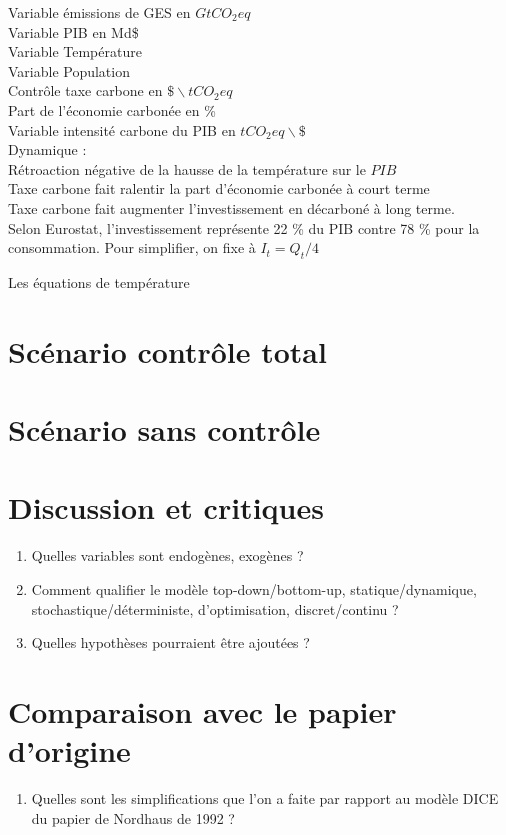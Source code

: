 \documentclass[12pt]{article}
\newcommand{\tco}{tCO_2eq}
\theoremstyle{remark}
\begin{document}
Variable émissions de GES en $G\tco$\\
Variable PIB en Md\$\\
Variable Température \\
Variable Population \\
Contrôle taxe carbone en $\$ \backslash \tco$ \\
Part de l'économie carbonée en \% \\
Variable intensité carbone du PIB en $\tco \backslash \$ $
\\
Dynamique : \\
Rétroaction négative de la hausse de la température sur le $PIB$ \\
Taxe carbone fait ralentir la part d'économie carbonée à court terme\\
Taxe carbone fait augmenter l'investissement en décarboné à long terme.\\
Selon Eurostat, l'investissement représente 22 \% du PIB contre 78 \% pour la consommation. Pour simplifier, on fixe à $I_t=Q_t/4$

Les équations de température

\section{Scénario contrôle total}


\section{Scénario sans contrôle}


\section{Discussion et critiques}
\begin{enumerate}[resume]
\item Quelles variables sont endogènes, exogènes ?
\item Comment qualifier le modèle top-down/bottom-up, statique/dynamique, stochastique/déterministe, d'optimisation, discret/continu ?
\item Quelles hypothèses pourraient être ajoutées ?
\end{enumerate}

\section{Comparaison avec le papier d'origine}
\begin{enumerate}[resume]
\item Quelles sont les simplifications que l'on a faite par rapport au modèle DICE du papier de Nordhaus de 1992 ?
\end{enumerate}
\end{document}
